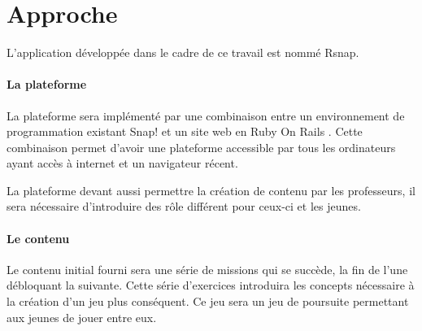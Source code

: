 \section{Approche}
\label{intro-approche}
L'application développée dans le cadre de ce travail est nommé \gls{Rsnap}.

\paragraph{La plateforme} La plateforme sera implémenté par une combinaison entre un environnement de programmation existant Snap! \cite{snap} et un site web en Ruby On Rails \cite{rails}. Cette combinaison permet d'avoir une plateforme accessible par tous les ordinateurs ayant accès à internet et un navigateur récent.

La plateforme devant aussi permettre la création de contenu par les professeurs, il sera nécessaire d'introduire des rôle différent pour ceux-ci et les jeunes.

\paragraph{Le contenu} Le contenu initial fourni sera une série de missions qui se succède, la fin de l'une débloquant la suivante. Cette série d'exercices introduira les concepts nécessaire à la création d'un jeu plus conséquent. Ce jeu sera un jeu de poursuite permettant aux jeunes de jouer entre eux.
